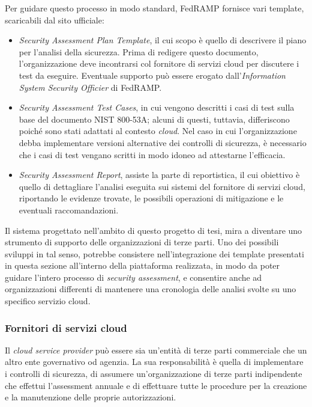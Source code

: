 \documentclass[../main.tex]{subfiles}
\begin{document}
Per guidare questo processo in modo standard, FedRAMP fornisce vari template, scaricabili dal sito ufficiale:
\begin{itemize}
    \item \textit{Security Assessment Plan Template}, il cui scopo è quello di descrivere il piano per l'analisi della sicurezza. Prima di redigere questo documento, l'organizzazione deve incontrarsi col fornitore di servizi cloud per discutere i test da eseguire. Eventuale supporto può essere erogato dall'\textit{Information System Security Officier} di FedRAMP.
    \item \textit{Security Assessment Test Cases}, in cui vengono descritti i casi di test sulla base del documento NIST 800-53A; alcuni di questi, tuttavia, differiscono poiché sono stati adattati al contesto \textit{cloud}. Nel caso in cui l'organizzazione debba implementare versioni alternative dei controlli di sicurezza, è necessario che i casi di test vengano scritti in modo idoneo ad attestarne l'efficacia.
    \item \textit{Security Assessment Report}, assiste la parte di reportistica, il cui obiettivo è quello di dettagliare l'analisi eseguita sui sistemi del fornitore di servizi cloud, riportando le evidenze trovate, le possibili operazioni di mitigazione e le eventuali raccomandazioni.
\end{itemize}

Il sistema progettato nell'ambito di questo progetto di tesi, mira a diventare uno strumento di supporto delle organizzazioni di terze parti.
Uno dei possibili sviluppi in tal senso, potrebbe consistere nell'integrazione dei template presentati in questa sezione all'interno della piattaforma realizzata, in modo da poter guidare l'intero processo di \textit{security assessment}, e consentire anche ad organizzazioni differenti di mantenere una cronologia delle analisi svolte su uno specifico servizio cloud. 

\subsubsection{Fornitori di servizi cloud}
Il \textit{cloud service provider} può essere sia un'entità di terze parti commerciale che un altro ente governativo od agenzia. La sua responsabilità è quella di implementare i controlli di sicurezza, di assumere un'organizzazione di terze parti indipendente che effettui l'assessment annuale e di effettuare tutte le procedure per la creazione e la manutenzione delle proprie autorizzazioni.
\end{document}
